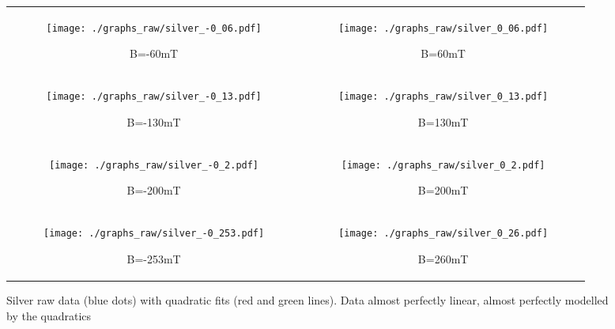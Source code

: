 \documentclass[a4paper]{article}
\begin{document}
	\begin{figure}[h]
		\centering
		\begin{tabular}{c|c}
			\begin{subfigure}[t]{0.45\textwidth}
				\centering
				\texttt{[image: ./graphs\_raw/silver\_-0\_06.pdf]}
				\caption{B=-60mT}
				\label{fig:silverRawGraph-60mT}
			\end{subfigure}
			&
			\begin{subfigure}[t]{0.45\textwidth}
				\centering
				\texttt{[image: ./graphs\_raw/silver\_0\_06.pdf]}
				\caption{B=60mT}
				\label{fig:silverRawGraph60mT}
			\end{subfigure}
			\\
			\begin{subfigure}[t]{0.45\textwidth}
				\centering
				\texttt{[image: ./graphs\_raw/silver\_-0\_13.pdf]}
				\caption{B=-130mT}
				\label{fig:silverRawGraph-130mT}
			\end{subfigure}
			&
			\begin{subfigure}[t]{0.45\textwidth}
				\centering
				\texttt{[image: ./graphs\_raw/silver\_0\_13.pdf]}
				\caption{B=130mT}
				\label{fig:silverRawGraph130mT}
			\end{subfigure}
			\\
			\begin{subfigure}[t]{0.45\textwidth}
				\centering
				\texttt{[image: ./graphs\_raw/silver\_-0\_2.pdf]}
				\caption{B=-200mT}
				\label{fig:silverRawGraph-200mT}
			\end{subfigure}
			&
			\begin{subfigure}[t]{0.45\textwidth}
				\centering
				\texttt{[image: ./graphs\_raw/silver\_0\_2.pdf]}
				\caption{B=200mT}
				\label{fig:silverRawGraph200mT}
			\end{subfigure}
			\\
			\begin{subfigure}[t]{0.45\textwidth}
				\centering
				\texttt{[image: ./graphs\_raw/silver\_-0\_253.pdf]}
				\caption{B=-253mT}
				\label{fig:silverRawGraph-253mT}
			\end{subfigure}
			&
			\begin{subfigure}[t]{0.45\textwidth}
				\centering
				\texttt{[image: ./graphs\_raw/silver\_0\_26.pdf]}
				\caption{B=260mT}
				\label{fig:silverRawGraph260mT}
			\end{subfigure}
		\end{tabular}
		\caption{Silver raw data (blue dots) with quadratic fits (red and green lines). Data almost perfectly linear, almost perfectly modelled by the quadratics}
		\label{fig:silverRawGraphs}
	\end{figure}
	
\end{document}
